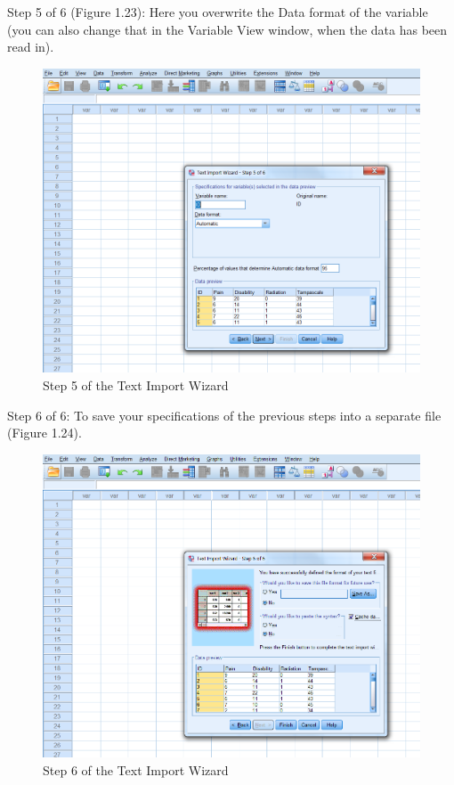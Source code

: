 \documentclass[]{book}
\theoremstyle{definition}
\theoremstyle{definition}
\theoremstyle{definition}
\theoremstyle{remark}
\begin{document}
Step 5 of 6 (Figure 1.23): Here you overwrite the Data format of the
variable (you can also change that in the Variable View window, when the
data has been read in).

\begin{figure}

{\centering \includegraphics[width=0.8\linewidth]{images/fig1.23} 

}

\caption{Step 5 of the Text Import Wizard}\label{fig:fig23}
\end{figure}

Step 6 of 6: To save your specifications of the previous steps into a
separate file (Figure 1.24).

\begin{figure}

{\centering \includegraphics[width=0.8\linewidth]{images/fig1.24} 

}

\caption{Step 6 of the Text Import Wizard}\label{fig:fig24}
\end{figure}
\end{document}

